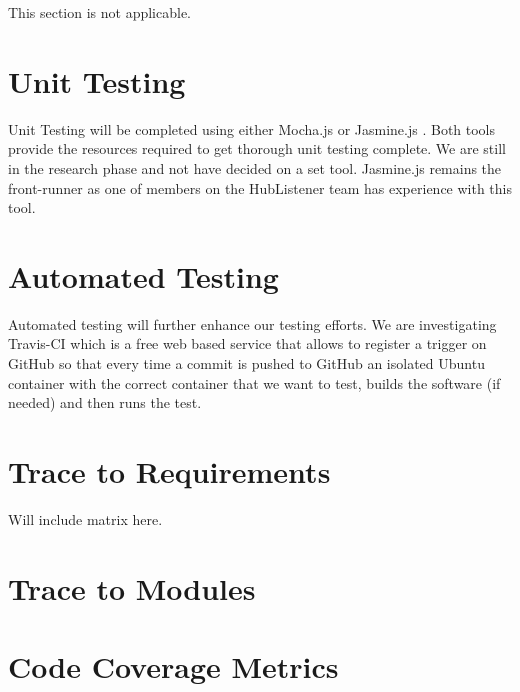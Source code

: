 \documentclass[12pt, titlepage]{article}
\begin{document}
This section is not applicable. 

\section{Unit Testing}

Unit Testing will  be completed using either Mocha.js or Jasmine.js . Both tools provide the resources required to get thorough unit testing complete. We are still in the research phase and not have decided on a set tool. Jasmine.js remains the front-runner as one of members on the HubListener team has experience with this tool. 


\section{Automated Testing}

Automated testing will further enhance our testing efforts. We are investigating Travis-CI which  is a free web based service that allows  to register a trigger on GitHub so that every time a commit is pushed to GitHub an isolated Ubuntu container with the correct container that we want to test, builds the software (if needed) and then runs the test.

		
\section{Trace to Requirements}

Will include matrix here. 
		
\section{Trace to Modules}		

\section{Code Coverage Metrics}




\end{document}

